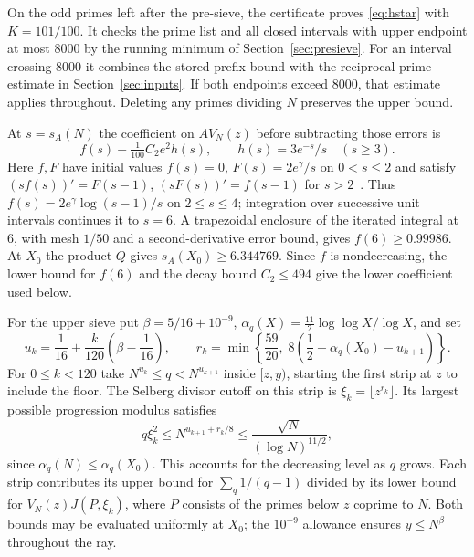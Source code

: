 \documentclass[11pt]{article}
\theoremstyle{remark}\newtheorem{remark}[theorem]{Remark}
\begin{document}
On the odd primes left after the pre-sieve, the certificate proves \eqref{eq:hstar} with $K=101/100$. It checks the prime list and all closed intervals with upper endpoint at most $8000$ by the running minimum of Section~\ref{sec:presieve}. For an interval crossing $8000$ it combines the stored prefix bound with the reciprocal-prime estimate in Section~\ref{sec:inputs}. If both endpoints exceed $8000$, that estimate applies throughout. Deleting any primes dividing $N$ preserves the upper bound.

At $s=s_A(N)$ the coefficient on $A V_N(z)$ before subtracting those errors is
\[
    f(s)-\tfrac{1}{100} C_2 e^2 h(s),\qquad h(s)=3e^{-s}/s\quad(s\ge3).
\]
Here $f,F$ have initial values $f(s)=0$, $F(s)=2e^\gamma/s$ on $0<s\le2$ and satisfy $(sf(s))'=F(s-1)$, $(sF(s))'=f(s-1)$ for $s>2$~\cite{BJS}. Thus $f(s)=2e^\gamma\log(s-1)/s$ on $2\le s\le4$; integration over successive unit intervals continues it to $s=6$. A trapezoidal enclosure of the iterated integral at $6$, with mesh $1/50$ and a second-derivative error bound, gives $f(6)\ge0.99986$. At $X_0$ the product $Q$ gives $s_A(X_0)\ge6.344769$. Since $f$ is nondecreasing, the lower bound for $f(6)$ and the decay bound $C_2\le494$ give the lower coefficient used below.

For the upper sieve put $\beta=5/16+10^{-9}$, $\alpha_q(X)=\tfrac{11}{2}\log\log X/\log X$, and set
\[
 u_k=\frac1{16}+\frac{k}{120}\left(\beta-\frac1{16}\right),\qquad
 r_k=\min\!\left\{\frac{59}{20},\;8\left(\frac12-\alpha_q(X_0)-u_{k+1}\right)\right\}.
\]
For $0\le k<120$ take $N^{u_k}\le q<N^{u_{k+1}}$ inside $[z,y)$, starting the first strip at $z$ to include the floor. The Selberg divisor cutoff on this strip is $\xi_k=\lfloor z^{r_k}\rfloor$. Its largest possible progression modulus satisfies
\[
    q\xi_k^2\le N^{u_{k+1}+r_k/8}\le\frac{\sqrt N}{(\log N)^{11/2}},
\]
since $\alpha_q(N)\le\alpha_q(X_0)$. This accounts for the decreasing level as $q$ grows. Each strip contributes its upper bound for $\sum_q1/(q-1)$ divided by its lower bound for $V_N(z)J(P,\xi_k)$, where $P$ consists of the primes below $z$ coprime to $N$. Both bounds may be evaluated uniformly at $X_0$; the $10^{-9}$ allowance ensures $y\le N^\beta$ throughout the ray.
\end{document}
